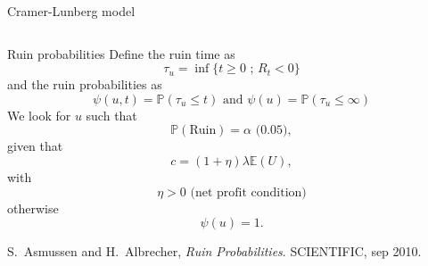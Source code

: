 \documentclass{beamer}
\begin{document}
\begin{frame}{Cramer-Lunberg model}
\begin{columns}
\begin{column}{0.5\textwidth}
\end{column}
\end{columns}

\end{frame}
\begin{frame}{Ruin probabilities}
\scriptsize
Define the ruin time as 
$$
\tau_u = \inf\{t\geq0\text{ ; }R_t <0\}
$$
and the ruin probabilities as 
$$
\psi(u,t) = \mathbb{P}(\tau_u \leq t)\text{ and }\psi(u) = \mathbb{P}(\tau_u \leq \infty)
$$
We look for $u$ such that 
$$
\mathbb{P}(\text{Ruin}) = \alpha\text{ (0.05)},
$$
given that 
$$
c=(1+\eta)\lambda\mathbb{E}(U),
$$
with 
$$\eta>0\text{ (net profit condition)}$$  
otherwise 
$$\psi(u)=1.$$

\tiny
\begin{thebibliography}{1}

S.~Asmussen and H.~Albrecher, {\em Ruin Probabilities}.
 {SCIENTIFIC}, sep 2010.

\end{thebibliography}

\end{frame}
\end{document}
